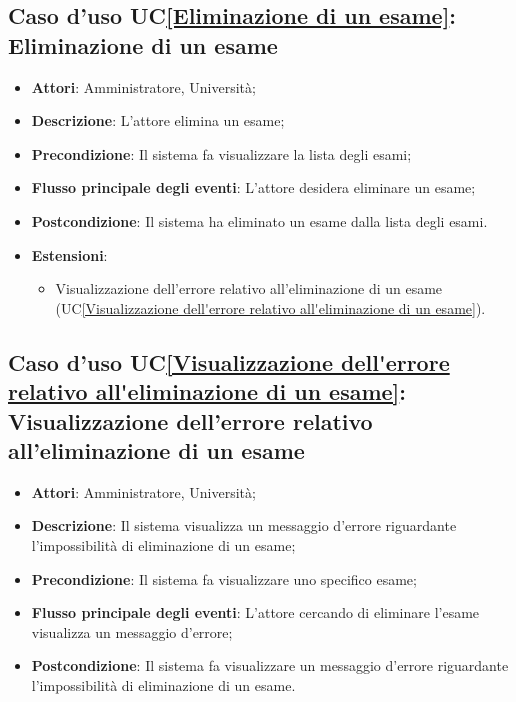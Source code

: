 \subsection{Caso d'uso UC\ref{Eliminazione di un esame}: Eliminazione di un esame}
\begin{itemize}
	\item \textbf{Attori}: Amministratore, Università;
	\item \textbf{Descrizione}: L'attore elimina un esame;
	
	\item \textbf{Precondizione}: Il sistema fa visualizzare la lista degli esami;
	
	\item \textbf{Flusso principale degli eventi}: L'attore desidera eliminare un esame;
	
	\item \textbf{Postcondizione}: Il sistema ha eliminato un esame dalla lista degli esami.
	
	\item \textbf{Estensioni}:
	\begin{itemize}
		\item Visualizzazione dell'errore relativo all'eliminazione di un esame (UC\ref{Visualizzazione dell'errore relativo all'eliminazione di un esame}).
	\end{itemize}
\end{itemize}

\subsection{Caso d'uso UC\ref{Visualizzazione dell'errore relativo all'eliminazione di un esame}: Visualizzazione dell'errore relativo all'eliminazione di un esame}
\begin{itemize}
	\item \textbf{Attori}: Amministratore, Università;
	\item \textbf{Descrizione}: Il sistema visualizza un messaggio d'errore riguardante l'impossibilità di eliminazione di un esame;
	\item \textbf{Precondizione}: Il sistema fa visualizzare uno specifico esame;
	
	\item \textbf{Flusso principale degli eventi}: L'attore cercando di eliminare l'esame visualizza un messaggio d'errore;
	\item \textbf{Postcondizione}: Il sistema fa visualizzare un messaggio d'errore riguardante l'impossibilità di eliminazione di un esame.
\end{itemize}




